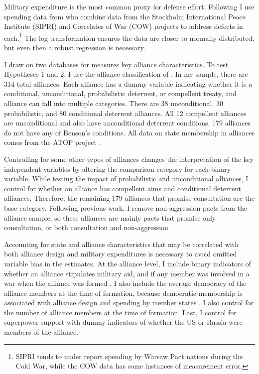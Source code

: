 \documentclass[12pt]{article}
\begin{document}
Military expenditure is the most common proxy for defense effort. Following \citet{DigiuseppePoast2016} I use spending data from \citet{Nordhausetal2012} who combine data from the Stockholm International Peace Institute (SIPRI) and Correlates of War (COW) projects to address defects in each.\footnote{SIPRI tends to under report spending by Warsaw Pact nations during the Cold War, while the COW data has some instances of measurement error.} The log transformation ensures the data are closer to normally distributed, but even then a robust regression is necessary. 

I draw on two databases for measures key alliance characteristics. To test Hypotheses 1 and 2, I use the alliance classification of \citet{Benson2012}. In my sample, there are 314 total alliances. Each alliance has a dummy variable indicating whether it is a conditional, unconditional, probabilistic deterrent, or compellent treaty, and alliance can fall into multiple categories. There are 38 unconditional, 30 probabilistic, and 80 conditional deterrent alliances. All 12 compellent alliances are unconditional and also have unconditional deterrent conditions. 179 alliances do not have any of Benson's conditions. All data on state membership in alliances comes from the ATOP project \citep{Leedsetal2002}. 

Controlling for some other types of alliances changes the interpretation of the key independent variables by altering the comparison category for each binary variable. While testing the impact of probabilistic and unconditional alliances, I control for whether an alliance has compellent aims and conditional deterrent alliances. Therefore, the remaining 179 alliances that promise consultation are the base category. Following previous work, I remove non-aggression pacts from the alliance sample, so these alliances are mainly pacts that promise only consultation, or both consultation and non-aggression. 

Accounting for state and alliance characteristics that may be correlated with both alliance design and military expenditures is necessary to avoid omitted variable bias in the estimates. At the alliance level, I include binary indicators of whether an alliance stipulates military aid, and if any member was involved in a war when the alliance was formed \citep{Leedsetal2002}. I also include the average democracy of the alliance members at the time of formation, because democratic membership is associated with alliance design \citep{Chibaetal2015} and spending by member states \citep{DigiuseppePoast2016}. I also control for the number of alliance members at the time of formation. Last, I control for superpower support with dummy indicators of whether the US or Russia were members of the alliance.  
\end{document}
